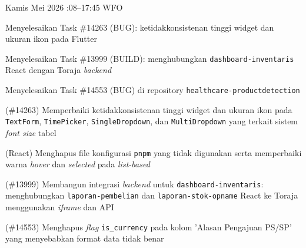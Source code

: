 \begin{logtable}
    {
        Kamis  Mei 2026 :08--17:45 \linebreak %
        WFO
    }{
        \begin{loglist}
            \item Menyelesaikan Task \#14263 (BUG): ketidakkonsistenan tinggi widget dan ukuran
            ikon pada Flutter
            \item Menyelesaikan Task \#13999 (BUILD): menghubungkan \texttt{dashboard-inventaris}
            React dengan Toraja \textit{backend}
            \item Menyelesaikan Task \#14553 (BUG) di repository
            \texttt{healthcare-productdetection}
        \end{loglist}
    }{
        \begin{logwork}
            \item (\#14263) Memperbaiki ketidakkonsistenan tinggi widget dan ukuran ikon pada \texttt{TextForm}, \texttt{TimePicker}, \texttt{SingleDropdown}, dan \texttt{MultiDropdown} yang terkait sistem \textit{font size} tabel
            \item (React) Menghapus file konfigurasi \texttt{pnpm} yang tidak digunakan serta memperbaiki warna \textit{hover} dan \textit{selected} pada \textit{list-based}
            \item (\#13999) Membangun integrasi \textit{backend} untuk \texttt{dashboard-inventaris}: menghubungkan \texttt{laporan-pembelian} dan \texttt{laporan-stok-opname} React ke Toraja menggunakan \textit{iframe} dan API
            \item (\#14553) Menghapus \textit{flag} \texttt{is\_currency} pada kolom 'Alasan Pengajuan PS/SP' yang menyebabkan format data tidak benar
        \end{logwork}
    }


\end{logtable}
